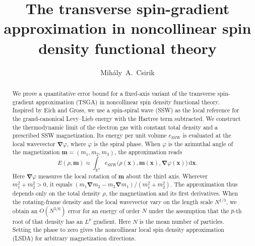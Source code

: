 \documentclass[final,reqno]{amsart}
\title[The TSGA in noncollinear SDFT]{The transverse spin-gradient approximation in noncollinear spin density functional theory}
\author[M.\,A. Csirik]{Mih\'aly~A.~Csirik}
\theoremstyle{remark}
\newcommand{\RR}{\mathbb{R}}
\newcommand{\SSW}{\mathrm{SSW}}
\newcommand{\grad}{\bm{\nabla}}
\newcommand{\dd}{\mathrm{d}}
\begin{document}
\begin{abstract}
We prove a quantitative error bound for a fixed-axis variant of the transverse spin-gradient approximation (TSGA) in noncollinear spin density functional theory. Inspired by Eich and Gross, we use a spin-spiral wave (SSW) as the local reference for the grand-canonical Levy--Lieb energy with the Hartree term subtracted. We construct the thermodynamic limit of the electron gas with constant total density and a prescribed SSW magnetization. Its energy per unit volume $e_\SSW$ is evaluated at the local wavevector $\grad\varphi$, where $\varphi$ is the spiral phase. When $\varphi$ is the azimuthal angle of the magnetization $\mathbf{m}=(m_1,m_2,m_3)$, the approximation reads
\[
 E(\rho,\mathbf{m})\approx\int_{\RR^3}e_\SSW\big(\rho(\mathbf{x}),\mathbf{m}(\mathbf{x}),\grad\varphi(\mathbf{x})\big)\,\dd \mathbf{x}.
\]
Here $\grad\varphi$ measures the local rotation of $\mathbf{m}$ about the third axis. Wherever $m_1^2+m_2^2>0$, it equals $(m_1\grad m_2-m_2\grad m_1)/(m_1^2+m_2^2)$. The approximation thus depends only on the total density $\rho$, the magnetization and its first derivatives.
When the rotating-frame density and the local wavevector vary on the length scale $N^{1/3}$, we obtain an $O(N^{5/6})$ error for an energy of order $N$ under the assumption that the $p$-th root of that density has an $L^p$ gradient. Here $N$ is the mean number of particles.
Setting the phase to zero gives the noncollinear local spin density approximation (LSDA) for arbitrary magnetization directions.
\end{abstract}

\maketitle

\clearpage
\tableofcontents
\end{document}
